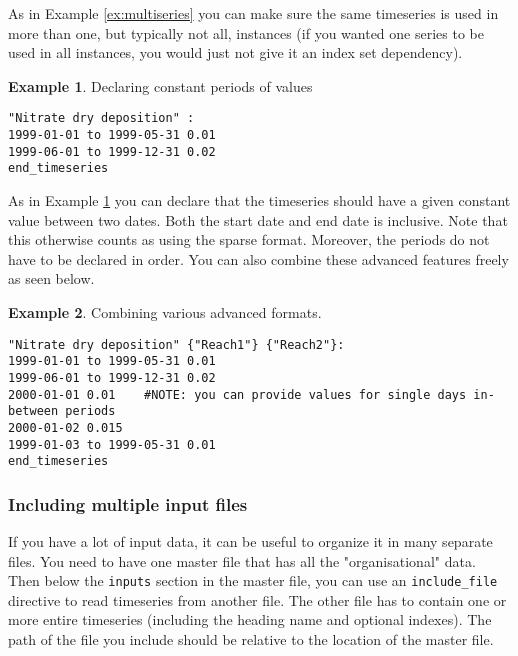 \documentclass[11pt]{article}
\theoremstyle{definition}
\newtheorem{myexample}{Example}
\newenvironment{example}%
  {\begin{lrbox}{\examplebox}%
   \begin{minipage}{\dimexpr\linewidth-2\fboxsep}
   \begin{myexample}}%
  {\end{myexample}%
   \end{minipage}%
   \end{lrbox}%
   \begin{trivlist}
     \item[]\colorbox{silver}{\usebox\examplebox}
   \end{trivlist}}
\begin{document}
As in Example \ref{ex:multiseries} you can make sure the same timeseries is used in more than one, but typically not all, instances (if you wanted one series to be used in all instances, you would just not give it an index set dependency).

\begin{example}\label{ex:constantperiods}
Declaring constant periods of values
\begin{lstlisting}
"Nitrate dry deposition" :
1999-01-01 to 1999-05-31 0.01
1999-06-01 to 1999-12-31 0.02
end_timeseries
\end{lstlisting}
\end{example}

As in Example \ref{ex:constantperiods} you can declare that the timeseries should have a given constant value between two dates. Both the start date and end date is inclusive. Note that this otherwise counts as using the sparse format. Moreover, the periods do not have to be declared in order. You can also combine these advanced features freely as seen below.

\begin{example}
Combining various advanced formats.
\begin{lstlisting}
"Nitrate dry deposition" {"Reach1"} {"Reach2"}:
1999-01-01 to 1999-05-31 0.01
1999-06-01 to 1999-12-31 0.02
2000-01-01 0.01    #NOTE: you can provide values for single days in-between periods
2000-01-02 0.015
1999-01-03 to 1999-05-31 0.01
end_timeseries
\end{lstlisting}
\end{example}

\subsubsection{Including multiple input files}

If you have a lot of input data, it can be useful to organize it in many separate files. You need to have one master file that has all the "organisational" data. Then below the {\tt inputs} section in the master file, you can use an {\tt include\_file} directive to read timeseries from another file. The other file has to contain one or more entire timeseries (including the heading name and optional indexes). The path of the file you include should be relative to the location of the master file.
\end{document}
